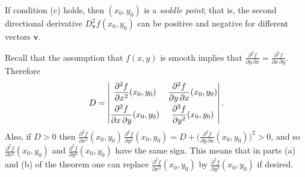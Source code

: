 
If condition (c) holds, then $(x_0,y_0)$ is a \emph{saddle point};
that is, the second directional derivative 
$D^2_\textbf{v}f(x_0,y_0)$ can be positive and negative for different vectors $\textbf{v}$.

Recall that the assumption that $f(x,y)$ is smooth implies that $\frac{\partial^2 f}{\partial y \, \partial x} = \frac{\partial^2 f}{\partial x \, \partial y}$. Therefore
\begin{displaymath}
 D =
 \begin{vmatrix}
  \dfrac{\partial^2 f}{\partial x^2}(x_0,y_0) & \dfrac{\partial^2 f}{\partial y \, \partial x}(x_0,y_0)\smallskip\\
  \dfrac{\partial^2 f}{\partial x \, \partial y}(x_0,y_0) & \dfrac{\partial^2 f}{\partial y^2}(x_0,y_0)
 \end{vmatrix}.
\end{displaymath} 
Also, if $D > 0$
then $\frac{\partial^2 f}{\partial x^2}(x_0,y_0) \, \frac{\partial^2 f}{\partial y^2}(x_0,y_0) = D +
\biggl( \frac{\partial^2 f}{\partial y \, \partial x}(x_0,y_0) \biggr)^2 > 0$, and so
$\frac{\partial^2 f}{\partial x^2}(x_0,y_0)$ and $\frac{\partial^2 f}{\partial y^2}(x_0,y_0)$ have the same sign. 
This means
that in parts (a) and (b) of the theorem one can replace $\frac{\partial^2 f}{\partial x^2}(x_0,y_0)$ by
$\frac{\partial^2 f}{\partial y^2}(x_0,y_0)$ if desired.

